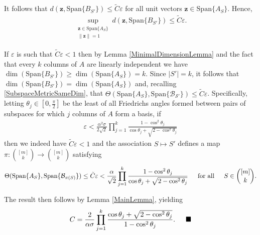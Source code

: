 \documentclass[journal,onecolumn]{IEEEtran}
\begin{document}
It follows that $d(\mathbf{z}, \text{Span}\{B_{S'}\}) \leq \tilde C\varepsilon$ for all unit vectors $\mathbf{z} \in \text{Span}\{A_S\}$. Hence,
\begin{align}\label{ABSubspaceDistance}
\sup_{ \substack{ \mathbf{z} \in \text{Span}\{A_{S}\} \\ \|\mathbf{z}\| = 1} } d(\mathbf{z}, \text{Span}\{B_{S'}\}) \leq \tilde C\varepsilon.
\end{align}

If $\varepsilon$ is such that $\tilde C\varepsilon < 1$ then by Lemma \ref{MinimalDimensionLemma} and the fact that every $k$ columns of $A$ are linearly independent we have $\dim(\text{Span}\{B_{S'}\}) \geq \dim(\text{Span}\{A_S\}) = k$. Since $|S'| = k$, it follows that $\dim(\text{Span}\{B_{S'}\}) = \dim(\text{Span}\{A_S\})$ and, recalling \eqref{SubspaceMetricSameDim}, that $\Theta(\text{Span}\{A_S\}, \text{Span}\{\mathcal{B_{S'}}\}) \leq \tilde C\varepsilon$. Specifically, letting $\theta_j \in [0, \frac{\pi}{2}]$ be the least of all Friedrichs angles formed between pairs of subspaces for which $j$ columns of $A$ form a basis, if
\begin{align}
\varepsilon < \frac{\alpha^2\sigma}{2\sqrt{2}} \prod_{j=1}^k \frac{1 - \cos^2\theta_j}{\cos\theta_j + \sqrt{2 - \cos^2\theta_j}}
\end{align}
%
then we indeed have $\tilde C\varepsilon < 1$ and the association $S \mapsto S'$ defines a map $\pi: {[m] \choose k} \to {[m] \choose k}$ satisfying 
\begin{align}
\Theta(\text{Span}\{A_S\}, \text{Span}\{\mathcal{B}_{\pi(S)}\}) \leq \tilde C\varepsilon < \frac{\alpha}{\sqrt{2}} \prod_{j=1}^k \frac{1 - \cos^2\theta_j} {\cos\theta_j + \sqrt{2 - \cos^2\theta_j}}
\indent \text{for all} \indent S \in {[m] \choose k}.
\end{align}

The result then follows by Lemma \ref{MainLemma}, yielding
\begin{align}
C = \frac{2}{\alpha\sigma} \prod_{j=1}^k \frac{\cos\theta_j + \sqrt{2 - \cos^2\theta_j}}{1 - \cos^2\theta_j}.  \indent \blacksquare
\end{align}

\end{document}

